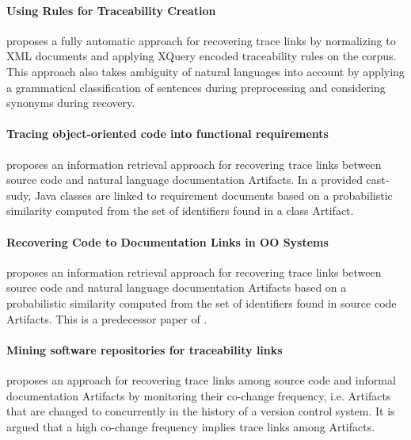 \paragraph*{Using Rules for Traceability Creation} 
\cite{Zisman2012}
proposes a fully automatic approach for recovering trace links by normalizing to \gls{XML} documents and applying XQuery encoded traceability rules on the corpus.
This approach also takes ambiguity of natural languages into account by applying a grammatical classification of sentences during preprocessing and considering synonyms during recovery.

\paragraph*{Tracing object-oriented code into functional requirements} 
\cite{AntoniolCCDM00}
proposes an information retrieval approach for recovering trace links between source code and natural language documentation \glspl{Artifact}.
In a provided cast-sudy, \gls{Java} classes are linked to requirement documents based on a probabilistic similarity computed from the set of identifiers found in a class \gls{Artifact}.

\paragraph*{Recovering Code to Documentation Links in OO Systems}
\cite{AntoniolCDLM99}
proposes an information retrieval approach for recovering trace links between source code and natural language documentation \glspl{Artifact} based on a  probabilistic similarity computed from the set of identifiers found in source code \glspl{Artifact}.
This is a predecessor paper of \cite{AntoniolCCDM00}.

\paragraph*{Mining software repositories for traceability links}
\cite{KagdiMS07}
proposes an approach for recovering trace links among source code and informal documentation \glspl{Artifact} by monitoring their co-change frequency, i.e. \glspl{Artifact} that are changed to concurrently in the history of a version control system.
It is argued that a high co-change frequency implies trace links among \glspl{Artifact}.


